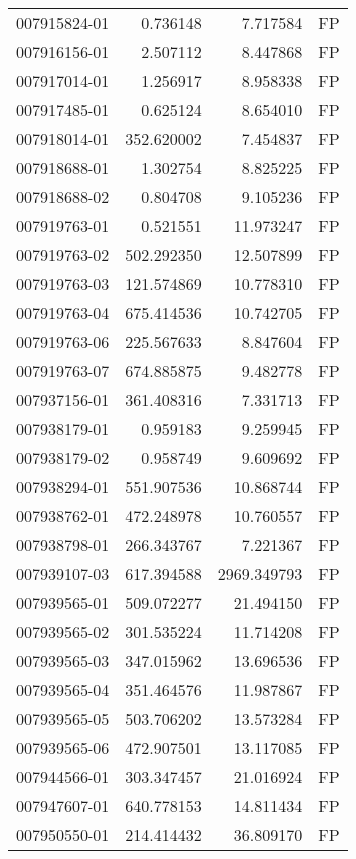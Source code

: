 \begin{tabular}{lrrl}
007915824-01 &    0.736148 &     7.717584 &   FP \\
007916156-01 &    2.507112 &     8.447868 &   FP \\
007917014-01 &    1.256917 &     8.958338 &   FP \\
007917485-01 &    0.625124 &     8.654010 &   FP \\
007918014-01 &  352.620002 &     7.454837 &   FP \\
007918688-01 &    1.302754 &     8.825225 &   FP \\
007918688-02 &    0.804708 &     9.105236 &   FP \\
007919763-01 &    0.521551 &    11.973247 &   FP \\
007919763-02 &  502.292350 &    12.507899 &   FP \\
007919763-03 &  121.574869 &    10.778310 &   FP \\
007919763-04 &  675.414536 &    10.742705 &   FP \\
007919763-06 &  225.567633 &     8.847604 &   FP \\
007919763-07 &  674.885875 &     9.482778 &   FP \\
007937156-01 &  361.408316 &     7.331713 &   FP \\
007938179-01 &    0.959183 &     9.259945 &   FP \\
007938179-02 &    0.958749 &     9.609692 &   FP \\
007938294-01 &  551.907536 &    10.868744 &   FP \\
007938762-01 &  472.248978 &    10.760557 &   FP \\
007938798-01 &  266.343767 &     7.221367 &   FP \\
007939107-03 &  617.394588 &  2969.349793 &   FP \\
007939565-01 &  509.072277 &    21.494150 &   FP \\
007939565-02 &  301.535224 &    11.714208 &   FP \\
007939565-03 &  347.015962 &    13.696536 &   FP \\
007939565-04 &  351.464576 &    11.987867 &   FP \\
007939565-05 &  503.706202 &    13.573284 &   FP \\
007939565-06 &  472.907501 &    13.117085 &   FP \\
007944566-01 &  303.347457 &    21.016924 &   FP \\
007947607-01 &  640.778153 &    14.811434 &   FP \\
007950550-01 &  214.414432 &    36.809170 &   FP \\

\end{tabular}
